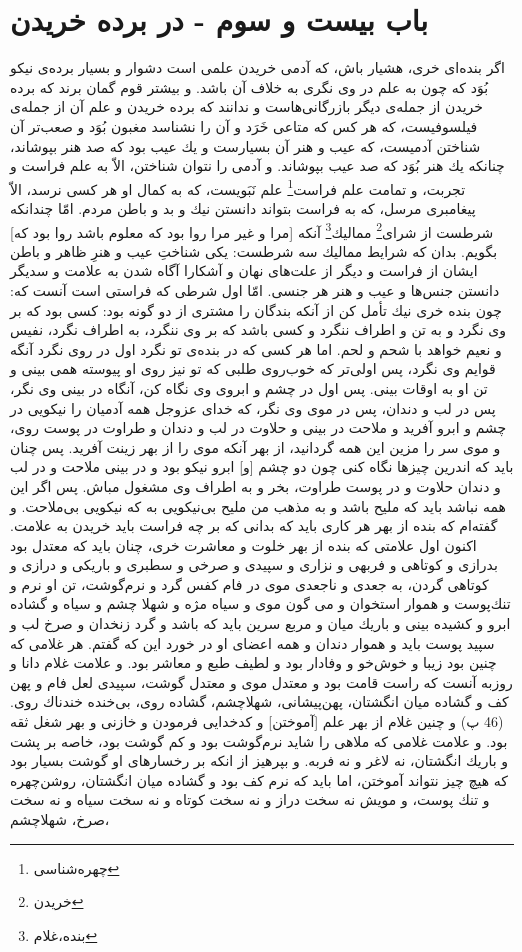 \section*{باب بیست و سوم - 
در برده خریدن}

اگر بنده‌اى خرى، هشيار باش، كه آدمى خريدن علمى است دشوار و بسيار برده‌ی نيكو بُوَد كه چون به علم در وى نگرى به خلاف آن باشد. و بيشتر قوم گمان برند كه برده خريدن از جمله‌ی ديگر بازرگانی‌هاست و ندانند كه برده خريدن و علم آن از جمله‌ی فيلسوفيست، كه هر كس كه متاعى خَرَد و آن را نشناسد مغبون بُوَد و صعب‌تر آن شناختن آدميست، كه عيب و هنر آن بسيارست و يك عيب بود كه صد هنر بپوشاند، چنانكه يك هنر بُوَد كه صد عيب بپوشاند. و آدمى را نتوان شناختن، الاّ به علم فراست و تجربت، و تمامت علم فراست\footnote{چهره‌شناسی} علم نَبَويست، كه به كمال او هر كسى نرسد، الاّ پيغامبرى مرسل، كه به فراست بتواند دانستن نيك و بد و باطن مردم. امّا چندانكه شرطست از شراى\footnote{خریدن} مماليك\footnote{بنده،‌غلام} آنكه [مرا و غير مرا روا بود كه معلوم باشد روا بود كه] بگويم. بدان كه شرايط مماليك سه شرطست: يكى شناختِ عيب و هنرِ ظاهر و باطن ايشان از فراست و ديگر از علت‌هاى نهان و آشكارا آگاه شدن به علامت و سديگر دانستن جنس‌ها و عيب و هنر هر جنسى. امّا اول شرطى كه فراستى است آنست كه: چون بنده خرى نيك تأمل كن از آنكه بندگان را مشترى از دو گونه بود: كسى بود كه بر وى نگرد و به تن و اطراف ننگرد و كسى باشد كه بر وى ننگرد، به اطراف نگرد، نفيس و نعيم خواهد با شحم و لحم. اما هر كسى كه در بنده‌ی تو نگرد اول در روى نگرد آنگه قوايم وى نگرد، پس اولى‌تر كه خوب‌روى طلبى كه تو نيز روى او پيوسته همى بينى و تن او به اوقات بينى. پس اول در چشم و ابروى وى نگاه كن، آنگاه در بينى وى نگر، پس در لب و دندان، پس در موى وى نگر، كه خداى عزوجل همه آدميان را نيكويى در چشم و ابرو آفريد و ملاحت در بينى و حلاوت در لب و دندان و طراوت در پوست روى، و موى سر را مزين اين همه گردانيد، از بهر آنكه موى را از بهر زينت آفريد. پس چنان بايد كه اندرين چيزها نگاه كنى چون دو چشم [و] ابرو نيكو بود و در بينى ملاحت و در لب و دندان حلاوت و در پوست طراوت، بخر و به اطراف وى مشغول مباش. پس اگر اين همه نباشد بايد كه مليح باشد و به مذهب من مليح بى‌نيكويى به كه نيكويى بى‌ملاحت. و گفته‌ام كه بنده از بهر هر كارى بايد كه بدانى كه بر چه فراست بايد خريدن به علامت. اكنون اول علامتى كه بنده از بهر خلوت و معاشرت خرى، چنان بايد كه معتدل بود بدرازى و كوتاهى و فربهى و نزارى و سپيدى و صرخى و سطبرى و باريكى و درازى و كوتاهى گردن، به جعدى و ناجعدى موى در فام كفس گرد و نرم‌گوشت، تن او نرم و تنك‌پوست و هموار استخوان و مى گون موى و سياه مژه و شهلا چشم و سياه و گشاده ابرو و كشيده بينى و باريك ميان و مربع سرين بايد كه باشد و گرد زنخدان و صرخ لب و سپيد پوست بايد و هموار دندان و همه اعضاى او در خورد اين كه گفتم. هر غلامى كه چنين بود زيبا و خوش‌خو و وفادار بود و لطيف طبع و معاشر بود. و علامت غلام دانا و روزبه آنست كه راست قامت بود و معتدل موى و معتدل گوشت، سپيدى لعل فام و پهن كف و گشاده ميان انگشتان، پهن‌پيشانى، شهلاچشم، گشاده روى، بى‌خنده خندناك روى. (46 پ) و چنين غلام از بهر علم [آموختن] و كدخدايى فرمودن و خازنى و بهر شغل ثقه بود. و علامت غلامى كه ملاهى را شايد نرم‌گوشت بود و كم گوشت بود، خاصه بر پشت و باريك انگشتان، نه لاغر و نه فربه. و بپرهيز از انكه بر رخسارهاى او گوشت بسيار بود كه هيچ چيز نتواند آموختن، اما بايد كه نرم كف بود و گشاده ميان انگشتان، روشن‌چهره و تنك پوست، و مويش نه سخت دراز و نه سخت كوتاه و نه سخت سياه و نه سخت صرخ، شهلاچشم، 